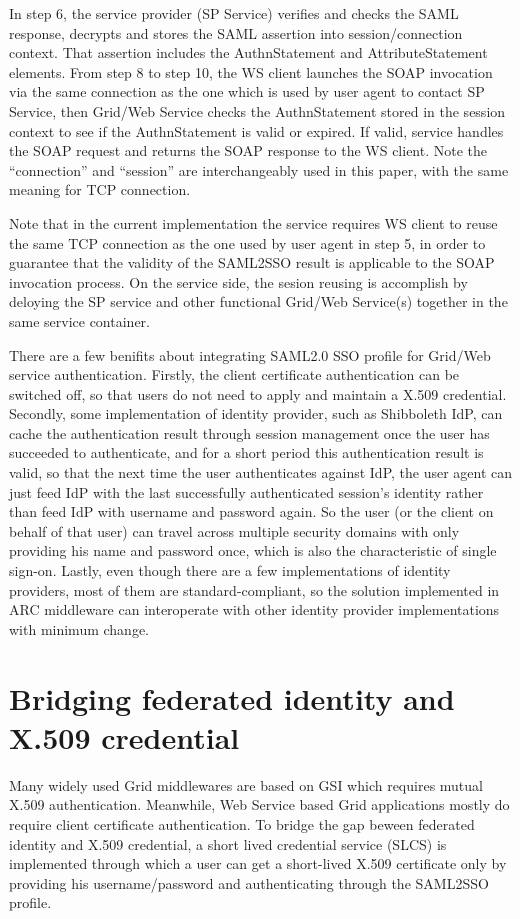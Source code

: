 \documentclass[conference]{IEEEtran}
\begin{document}
In step 6, the service provider (SP Service) verifies and checks the SAML response, decrypts and stores 
the SAML assertion into session/connection context. That assertion includes the AuthnStatement and 
AttributeStatement elements. From step 8 to step 10, the WS client launches the SOAP invocation via 
the same connection as the one which is used by user agent to contact SP Service, then Grid/Web Service 
checks the AuthnStatement stored in the session context to see if the AuthnStatement is valid or expired. 
If valid, service handles the SOAP request and returns the SOAP response to the WS client. Note
the ``connection'' and ``session'' are interchangeably used in this paper, with the same meaning for 
TCP connection.

Note that in the current implementation the service requires WS client to reuse the same 
TCP connection as the one used by user agent in step 5, in order to guarantee that the validity of 
the SAML2SSO result is applicable to the SOAP invocation process. On the service side, 
the sesion reusing is accomplish by deloying the SP service and other functional Grid/Web Service(s) 
together in the same service container. 

There are a few benifits about integrating SAML2.0 SSO profile for Grid/Web service authentication. 
Firstly, the client certificate authentication can be switched off, so that users do not need 
to apply and maintain a X.509 credential. Secondly, some implementation of identity provider, such as 
Shibboleth IdP, can cache the authentication result through session management once the user
has succeeded to authenticate, and for a short period this authentication result is valid, so that 
the next time the user authenticates against IdP, the user agent can just feed IdP with the last 
successfully authenticated session's identity rather than feed IdP with username and password again. So 
the user (or the client on behalf of that user) can travel across multiple security domains with 
only providing his name and password once, which is also the characteristic of single sign-on.
Lastly, even though there are a few implementations of identity providers, most of them are 
standard-compliant, so the solution implemented in ARC middleware can interoperate with other 
identity provider implementations with minimum change.

\section{Bridging federated identity and X.509 credential}
\label{sec:fedidtoX509}
Many widely used Grid middlewares are based on GSI which requires mutual X.509 authentication. 
Meanwhile, Web Service based Grid applications mostly do require client certificate authentication.  
To bridge the gap beween federated identity and X.509 credential, a short lived credential 
service (SLCS) is implemented through which a user can get a short-lived X.509 certificate only by
providing his username/password and authenticating through the SAML2SSO profile.
\end{document}
